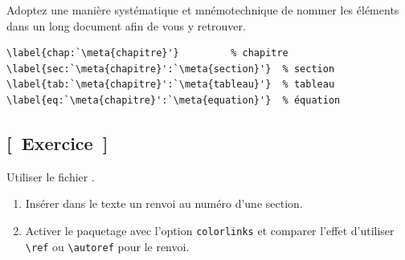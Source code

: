 \begin{conseil}
  Adoptez une manière systématique et mnémotechnique de nommer les
  éléments dans un long document afin de vous y retrouver.

  \bigskip %
\begin{lstlisting}[basicstyle=\ttfamily\NoAutoSpacing\color{dark}]
\label{chap:`\meta{chapitre}'}         % chapitre
\label{sec:`\meta{chapitre}':`\meta{section}'}  % section
\label{tab:`\meta{chapitre}':`\meta{tableau}'}  % tableau
\label{eq:`\meta{chapitre}':`\meta{equation}'}  % équation
\end{lstlisting}
\end{conseil}

\subsection{[~Exercice~]}

\begin{exercice}
  Utiliser le fichier .
  \begin{enumerate}
  \item Insérer dans le texte un renvoi au numéro d'une section.
  \item Activer le paquetage  avec l'option
    \texttt{colorlinks} et comparer l'effet d'utiliser
    \texttt{{\textbackslash}ref} ou \texttt{{\textbackslash}autoref}
    pour le renvoi.
  \end{enumerate}
\end{exercice}

